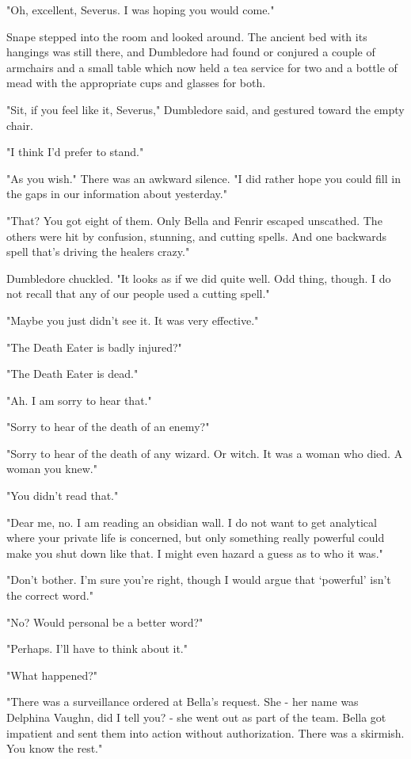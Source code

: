 \documentclass[a4paper,11pt]{article}
\begin{document}
"Oh, excellent, Severus. I was hoping you would come."

Snape stepped into the room and looked around. The ancient bed with its hangings was still there, and Dumbledore had found or conjured a couple of armchairs and a small table which now held a tea service for two and a bottle of mead with the appropriate cups and glasses for both.

"Sit, if you feel like it, Severus," Dumbledore said, and gestured toward the empty chair.

"I think I'd prefer to stand."

"As you wish." There was an awkward silence. "I did rather hope you could fill in the gaps in our information about yesterday."

"That? You got eight of them. Only Bella and Fenrir escaped unscathed. The others were hit by confusion, stunning, and cutting spells. And one backwards spell that's driving the healers crazy."

Dumbledore chuckled. "It looks as if we did quite well. Odd thing, though. I do not recall that any of our people used a cutting spell."

"Maybe you just didn't see it. It was very effective."

"The Death Eater is badly injured?"

"The Death Eater is dead."

"Ah. I am sorry to hear that."

"Sorry to hear of the death of an enemy?"

"Sorry to hear of the death of any wizard. Or witch. It was a woman who died. A woman you knew."

"You didn't read that."

"Dear me, no. I am reading an obsidian wall. I do not want to get analytical where your private life is concerned, but only something really powerful could make you shut down like that. I might even hazard a guess as to who it was."

"Don't bother. I'm sure you're right, though I would argue that `powerful' isn't the correct word."

"No? Would personal be a better word?"

"Perhaps. I'll have to think about it."

"What happened?"

"There was a surveillance ordered at Bella's request. She - her name was Delphina Vaughn, did I tell you? - she went out as part of the team. Bella got impatient and sent them into action without authorization. There was a skirmish. You know the rest."
\end{document}

